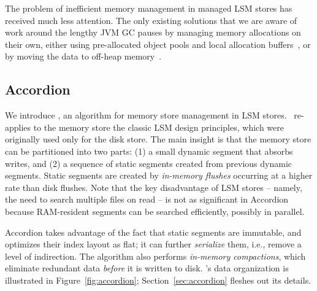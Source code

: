 The problem of inefficient memory management in managed LSM stores has received much less attention. 
The only existing  solutions that we are aware of work around the lengthy JVM GC pauses by managing memory allocations on their own, either using pre-allocated object pools and local allocation buffers~\cite{hbasemslab}, or by moving the data to off-heap memory~\cite{cassandraoffheap}. 

\subsection{Accordion} 
We introduce \sys, an algorithm for memory store management in LSM stores. 
\sys\ re-applies to the memory store 
the classic LSM  design principles, which were originally used only for the disk store. 
The main insight is that the memory store can be partitioned into two parts: (1) 
 a small dynamic segment that absorbs writes, and (2) a sequence of static segments created 
 from previous dynamic segments. Static segments are created by \emph{in-memory flushes} occurring at a higher rate
 than disk flushes.  
 Note that the key disadvantage of LSM stores -- namely, the need to search multiple files on read -- 
is not as significant in Accordion because  RAM-resident segments can be searched efficiently, possibly 
in parallel.
 
 Accordion takes advantage of the fact that static segments are immutable, and 
 optimizes their index layout as flat; it can further \emph{serialize} them, i.e., remove a level of indirection.
 The algorithm also performs \emph{in-memory compactions}, which eliminate redundant %
 data \emph{before} it is written to disk.
\sys's data organization is illustrated in Figure~\ref{fig:accordion};
 Section~\ref{sec:accordion} fleshes out its details.

